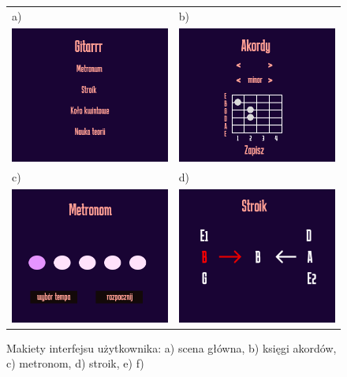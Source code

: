 \begin{figure}[htb]
    \centering
     \begin{tabular}{ll}
        a) & b) \\
        \includegraphics[width=0.4\linewidth]{rys03/MakMain} & \includegraphics[width=0.4\linewidth]{rys03/MakAkordy}
        \\
        c) & d) \\
        \includegraphics[width=0.4\linewidth]{rys03/MakMetronom} & \includegraphics[width=0.4\linewidth]{rys03/MakStroik}
    \end{tabular}
        \caption{Makiety interfejsu użytkownika: a) scena główna, b) księgi akordów, c) metronom, d) stroik, e) f)}
        \label{fig:pageLayout1}
    
\end{figure}


